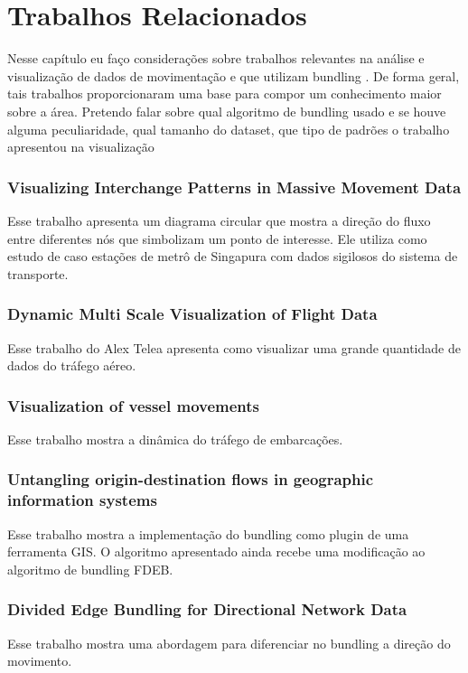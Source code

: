 \chapter{Trabalhos Relacionados}
\label{cap:trabalhos-relacionados}

Nesse capítulo eu faço considerações sobre trabalhos relevantes na análise e
visualização de dados de movimentação e que utilizam bundling .  De forma
geral, tais trabalhos proporcionaram uma base para compor um conhecimento maior
sobre  a área. Pretendo falar sobre qual algoritmo de bundling usado e se houve
alguma peculiaridade, qual tamanho do dataset, que tipo de padrões o trabalho
apresentou na visualização

\subsection{Visualizing Interchange Patterns in Massive Movement Data}
  \cite{doi:10.1111/cgf.12114}
  Esse trabalho apresenta um diagrama circular que mostra a direção do fluxo
entre diferentes nós que simbolizam um ponto de interesse. Ele utiliza como estudo
de caso estações de metrô de Singapura com dados sigilosos do sistema de transporte.

\subsection{Dynamic Multi Scale Visualization of Flight Data}
 Esse trabalho do Alex Telea apresenta como visualizar uma grande quantidade
de dados do tráfego aéreo. 

\subsection{Visualization of vessel movements}
 Esse trabalho mostra a dinâmica do tráfego de embarcações.

\subsection{Untangling origin-destination flows in geographic information systems}
 Esse trabalho mostra a implementação do bundling como plugin de uma ferramenta GIS.
O algoritmo apresentado ainda recebe uma modificação ao algoritmo de bundling FDEB.

\subsection{Divided Edge Bundling for Directional Network Data}
  Esse trabalho mostra uma abordagem para diferenciar no bundling a direção do movimento.

